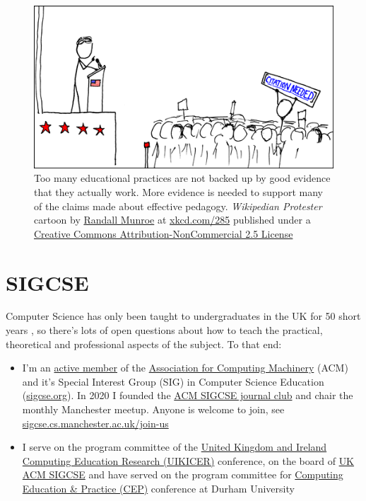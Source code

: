 \documentclass[
  12pt,
]{book}
\providecommand{\tightlist}{%
  \setlength{\itemsep}{0pt}\setlength{\parskip}{0pt}}
\begin{document}
\begin{figure}

{\centering \includegraphics[width=0.7\linewidth]{images/wikipedian_protester} 

}

\caption{Too many educational practices are not backed up by good evidence that they actually work. More evidence is needed to support many of the claims made about effective pedagogy. \emph{Wikipedian Protester} cartoon by \href{https://en.wikipedia.org/wiki/Randall_Munroe}{Randall Munroe} at \href{https://xkcd.com/285/}{xkcd.com/285} published under a \href{https://creativecommons.org/licenses/by-nc/2.5/}{Creative Commons Attribution-NonCommercial 2.5 License}}\label{fig:unnamed-chunk-5}
\end{figure}



\hypertarget{sigcse}{%
\section{SIGCSE}\label{sigcse}}

Computer Science has only been taught to undergraduates in the UK for 50 short years \citep{babygrowsup, sigcse50}, so there's lots of open questions about how to teach the practical, theoretical and professional aspects of the subject. To that end:

\begin{itemize}
\tightlist
\item
  I'm an \href{https://dl.acm.org/profile/81350580198}{active member} of the \href{https://en.wikipedia.org/wiki/Association_for_Computing_Machinery}{Association for Computing Machinery} (ACM) and it's Special Interest Group (SIG) in Computer Science Education (\href{https://sigcse.org}{sigcse.org}). In 2020 I founded the \href{https://sigcse.cs.manchester.ac.uk/}{ACM SIGCSE journal club} and chair the monthly Manchester meetup. Anyone is welcome to join, see \href{https://sigcse.cs.manchester.ac.uk/join-us}{sigcse.cs.manchester.ac.uk/join-us}
\item
  I serve on the program committee of the \href{https://www.ukicer.com/}{United Kingdom and Ireland Computing Education Research (UIKICER)} conference, on the board of \href{https://uki-sigcse.acm.org/about}{UK ACM SIGCSE} and have served on the program committee for \href{http://community.dur.ac.uk/cep.conference}{Computing Education \& Practice (CEP)} conference at Durham University
\end{itemize}
\end{document}
